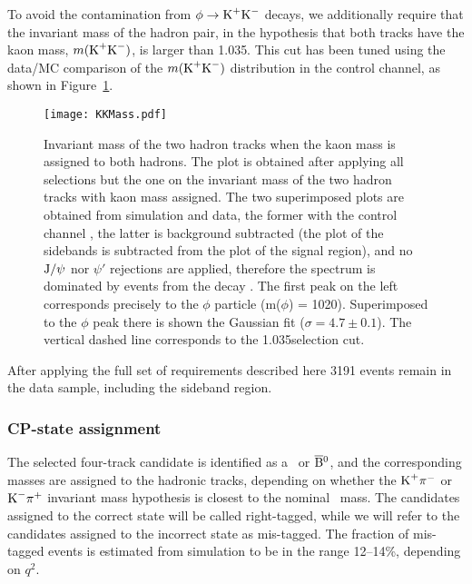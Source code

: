 
To avoid the contamination from $\phi\to\textrm{K}^{+}\textrm{K}^{-}$ decays, we additionally require that the invariant mass of the hadron pair, in the hypothesis that both tracks have the kaon mass, $m(\textrm{K}^{+}\textrm{K}^{-})$, is larger than 1.035\GeV.
This cut has been tuned using the data/MC comparison of the $m(\textrm{K}^{+}\textrm{K}^{-})$ distribution in the \BtoKstJpsimumu control channel, as shown in Figure~\ref{fig:kkmass}.

\begin{figure}[hbtp]
  \begin{center}
    \texttt{[image: KKMass.pdf]}
    \caption{Invariant mass of the two hadron tracks when the kaon mass is assigned to both hadrons.
      The plot is obtained after applying all selections but the one on the invariant mass of the two hadron tracks with kaon mass assigned.
      The two superimposed plots are obtained from simulation and data, the former with the control channel \BtoKstJpsimumu, the latter is background subtracted (the plot of the sidebands is subtracted from the plot of the signal region), and no $\textrm{J}/\psi$ nor $\psi'$ rejections are applied, therefore the spectrum is dominated by events from the decay \BtoKstJpsimumu.
      The first peak on the left corresponds precisely to the $\phi$ particle (m($\phi$) = 1020\MeV).
      Superimposed to the $\phi$ peak there is shown the Gaussian fit ($\sigma = 4.7\pm0.1$\MeV).
      The vertical dashed line corresponds to the 1.035\GeV selection cut.}
    \label{fig:kkmass}
  \end{center}
\end{figure}

After applying the full set of requirements described here 3191 events remain in the data sample, including the sideband region.

\subsubsection{CP-state assignment}

The selected four-track candidate is identified as a \PBz\ or $\overline{\textrm{B}}{}^{0}$, and the corresponding masses are assigned to the hadronic tracks, depending on whether the $\textrm{K}^{+}\pi^{-}$ or $\textrm{K}^{-}\pi^{+}$ invariant mass hypothesis is closest to the nominal \cPKstz\ mass.
The candidates assigned to the correct state will be called right-tagged, while we will refer to the candidates assigned to the incorrect state as mis-tagged.
The fraction of mis-tagged events is estimated from simulation to be in the range 12--14\%, depending on $q^2$.

